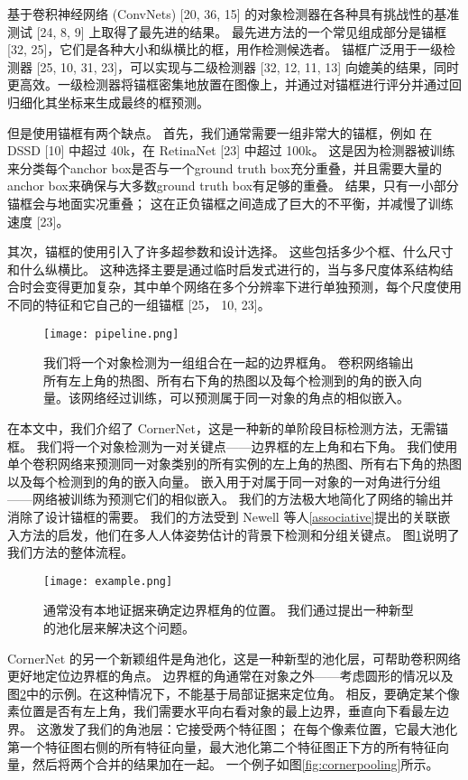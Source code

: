 \documentclass[../main]{subfile}
\begin{document}
基于卷积神经网络 (ConvNets) [20, 36, 15] 的对象检测器在各种具有挑战性的基准测试 [24, 8, 9] 上取得了最先进的结果。 最先进方法的一个常见组成部分是锚框 [32, 25]，它们是各种大小和纵横比的框，用作检测候选者。 锚框广泛用于一级检测器 [25, 10, 31, 23]，可以实现与二级检测器 [32, 12, 11, 13] 向媲美的结果，同时更高效。一级检测器将锚框密集地放置在图像上，并通过对锚框进行评分并通过回归细化其坐标来生成最终的框预测。

但是使用锚框有两个缺点。 首先，我们通常需要一组非常大的锚框，例如 在 DSSD [10] 中超过 40k，在 RetinaNet [23] 中超过 100k。 这是因为检测器被训练来分类每个anchor box是否与一个ground truth box充分重叠，并且需要大量的anchor box来确保与大多数ground truth box有足够的重叠。 结果，只有一小部分锚框会与地面实况重叠； 这在正负锚框之间造成了巨大的不平衡，并减慢了训练速度 [23]。

其次，锚框的使用引入了许多超参数和设计选择。 这些包括多少个框、什么尺寸和什么纵横比。 这种选择主要是通过临时启发式进行的，当与多尺度体系结构结合时会变得更加复杂，其中单个网络在多个分辨率下进行单独预测，每个尺度使用不同的特征和它自己的一组锚框 [25， 10, 23]。

\begin{figure}[bh]
    \centering
    \texttt{[image: pipeline.png]}
    \caption{我们将一个对象检测为一组组合在一起的边界框角。 卷积网络输出所有左上角的热图、所有右下角的热图以及每个检测到的角的嵌入向量。该网络经过训练，可以预测属于同一对象的角点的相似嵌入。}
    \label{fig:pipeline}
\end{figure}

在本文中，我们介绍了 CornerNet，这是一种新的单阶段目标检测方法，无需锚框。 我们将一个对象检测为一对关键点——边界框的左上角和右下角。 我们使用单个卷积网络来预测同一对象类别的所有实例的左上角的热图、所有右下角的热图以及每个检测到的角的嵌入向量。 嵌入用于对属于同一对象的一对角进行分组——网络被训练为预测它们的相似嵌入。 我们的方法极大地简化了网络的输出并消除了设计锚框的需要。 我们的方法受到 Newell 等人\ref{associative}提出的关联嵌入方法的启发，他们在多人人体姿势估计的背景下检测和分组关键点。 图\ref{fig:pipeline}说明了我们方法的整体流程。

\begin{figure}[bh]
    \centering
    \texttt{[image: example.png]}
    \caption{通常没有本地证据来确定边界框角的位置。 我们通过提出一种新型的池化层来解决这个问题。}
    \label{fig:example}
\end{figure}

CornerNet 的另一个新颖组件是角池化，这是一种新型的池化层，可帮助卷积网络更好地定位边界框的角点。 边界框的角通常在对象之外——考虑圆形的情况以及图\ref{fig:example}中的示例。在这种情况下，不能基于局部证据来定位角。 相反，要确定某个像素位置是否有左上角，我们需要水平向右看对象的最上边界，垂直向下看最左边界。 这激发了我们的角池层：它接受两个特征图； 在每个像素位置，它最大池化第一个特征图右侧的所有特征向量，最大池化第二个特征图正下方的所有特征向量，然后将两个合并的结果加在一起。 一个例子如图\ref{fig:cornerpooling}所示。
\end{document}
